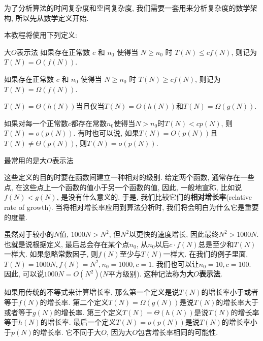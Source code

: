\documentclass[oneside]{ctexbook}
\begin{document}
{为了分析算法的时间复杂度和空间复杂度, 我们需要一套用来分析复杂度的数学架构, 所以先从数学定义开始.

本教程将使用下列定义:

\begin{mydefinition}{大$O$表示法}{}
    如果存在正常数 $c$ 和 $n_0$ 使得当 $N \geq n_0$ 时 $T(N) \leq cf(N)$, 则记为 $T(N) = O(f(N))$.
\end{mydefinition}

\begin{mydefinition}{}{}
    如果存在正常数 $c$ 和 $n_0$ 使得当 $N \geq n_0$ 时 $T(N) \geq cf(N)$, 则记为 $T(N) = \Omega(f(N))$.
\end{mydefinition}

\begin{mydefinition}{}{}
    $T(N)=\varTheta(h(N))$当且仅当$T(N)=O(h(N))$和$T(N)=\Omega(g(N))$.
\end{mydefinition}

\begin{mydefinition}{}{}
    如果对每一个正常数$c$都存在常数$n_0$使得当$N>n_0$时$T(N)<cp(N)$, 则$T(N)=o(p(N))$. 有时也可以说, 如果$T(N)=O(p(N))$且$T(N)\neq \varTheta(p(N))$, 则$T(N)=o(p(N))$.
\end{mydefinition}

\begin{marker}
最常用的是大$O$表示法
\end{marker}

这些定义的目的时要在函数间建立一种相对的级别. 给定两个函数, 通常存在一些点, 在这些点上一个函数的值小于另一个函数的值, 因此, 一般地宣称, 比如说$f(N)<g(N)$, 是没有什么意义的. 于是, 我们比较它们的\textbf{相对增长率}(relative rate of growth). 当将相对增长率应用到算法分析时, 我们将会明白为什么它是重要的度量.

虽然对于较小的$N$值, $1000N > N^2$, 但$N^2$以更快的速度增长, 因此最终$N^2 > 1000N$. 也就是说根据定义, 最后总会存在某个点$n_0$, 从$n_0$以后$c\cdot f(N)$总是至少和$T(N)$一样大. 如果忽略常数因子, 则$f(N)$至少与$T(N)$一样大. 在我们的例子里面, $T(N)=1000N, f(N)=N^2, n_0=1000, c=1$. 我们也可以让$n_0=10, c=100$. 因此, 可以说$1000N=O(N^2)$($N$平方级别). 这种记法称为\textbf{大$O$表示法}.

如果用传统的不等式来计算增长率, 那么第一个定义是说$T(N)$的增长率小于或者等于$f(N)$的增长率. 第二个定义$T(N)=\Omega(g(N))$是说$T(N)$的增长率大于或者等于$g(N)$的增长率. 第三个定义$T(N)=\varTheta(h(N))$是说$T(N)$的增长率等于$h(N)$的增长率. 最后一个定义$T(N)=o(p(N))$是说$T(N)$的增长率小于$p(N)$的增长率. 它不同于大$O$, 因为大$O$包含增长率相同的可能性.

}
\end{document}

